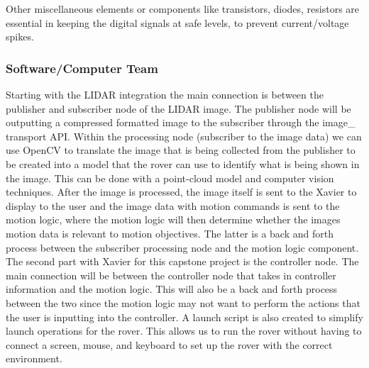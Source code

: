 \documentclass[a4paper, 10pt]{article}
\begin{document}
		Other miscellaneous elements or components like transistors, diodes, resistors are essential in keeping the digital signals at safe levels, to prevent current/voltage spikes.
		
		\subsubsection{Software/Computer Team}
	Starting with the LIDAR integration the main connection is between the publisher and subscriber node of the LIDAR image. The publisher node will be outputting a compressed formatted image to the subscriber through the image\_ transport API. Within the processing node (subscriber to the image data) we can use OpenCV to translate the image that is being collected from the publisher to be created into a model that the rover can use to identify what is being shown in the image. This can be done with a point-cloud model and computer vision techniques. After the image is processed, the image itself is sent to the Xavier to display to the user and the image data with motion commands is sent to the motion logic, where the motion logic will then determine whether the images motion data is relevant to motion objectives. The latter is a back and forth process between the subscriber processing node and the motion logic component. 
The second part with Xavier for this capstone project is the controller node. The main connection will be between the controller node that takes in controller information and the motion logic. This will also be a back and forth process between the two since the motion logic may not want to perform the actions that the user is inputting into the controller. A launch script is also created to simplify launch operations for the rover. This allows us to run the rover without having to connect a screen, mouse, and keyboard to set up the rover with the correct environment.
\end{document}
